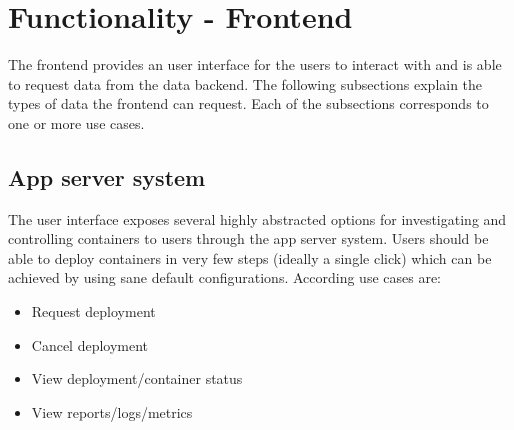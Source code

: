 \documentclass[a4paper,12pt,chapterprefix=false,bibliography=totoc,listof=totoc,]{scrreprt}
\begin{document}
\section{Functionality - Frontend}


The frontend provides an user interface for the users to interact with and is able to request data from the data backend. The following subsections explain the types of data the frontend can request. Each of the subsections corresponds to one or more use cases.




\subsection{{App server system}}
The user interface exposes several highly abstracted options for investigating and controlling containers to users through the app server system. Users should be able to deploy containers in very few steps (ideally a single click) which can be achieved by using sane default configurations. According use cases are:

\begin{itemize}
    \item Request deployment
    \item Cancel deployment
    \item View deployment/container status
    \item View reports/logs/metrics
\end{itemize}
\end{document}
